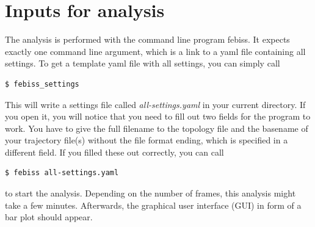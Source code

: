 \documentclass[12pt]{scrartcl} %
\begin{document}
\section{Inputs for analysis}
The analysis is performed with the command line program febiss. It expects exactly one command line argument, which is a link to a yaml file containing all settings. To get a template yaml file with all settings, you can simply call
\begin{lstlisting}[language=bash]
$ febiss_settings
\end{lstlisting}
This will write a settings file called \textit{all-settings.yaml} in your current directory. If you open it, you will notice that you need to fill out two fields for the program to work. You have to give the full filename to the topology file and the basename of your trajectory file(s) without the file format ending, which is specified in a different field. If you filled these out correctly, you can call
\begin{lstlisting}[language=bash]
$ febiss all-settings.yaml
\end{lstlisting}
to start the analysis. Depending on the number of frames, this analysis might take a few minutes. Afterwards, the graphical user interface (GUI) in form of a bar plot should appear.
\end{document}
